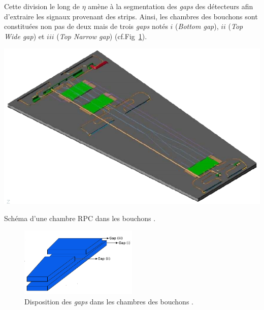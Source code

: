 Cette division le long de $\eta$ amène à la segmentation des \textit{gaps} des détecteurs afin d'extraire les signaux provenant des strips. Ainsi, les chambres des bouchons sont constituées non pas de deux mais de trois \textit{gaps} notés $i$ (\textit{Bottom gap}), $ii$ (\textit{Top Wide gap}) et $iii$ (\textit{Top Narrow gap})
 (cf.Fig~\ref{gapslayout}). 
\marginpar
{
	\centering
	\includegraphics[width=\marginparwidth]{RPC/schemerpc.png}
	\captionsetup{type=figure}\caption{Schéma d'une chambre RPC dans les bouchons \cite{Tytgat:1477019}.}
	\label{trap}
}
\begin{figure}[ht!]
	\centering
	\includegraphics[width=0.50\textwidth]{RPC/gaps.png}
	\captionsetup{type=figure}\caption{Disposition des \textit{gaps} dans les chambres des bouchons \cite{gapss}.}
	\label{gapslayout}
\end{figure}

\vspace{-0.8cm}
